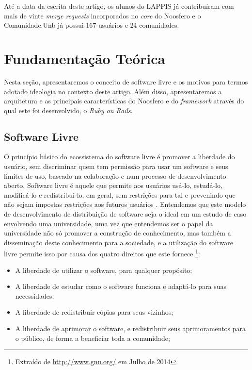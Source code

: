 \documentclass[12pt]{article}
\begin{document}
Até a data da escrita deste artigo, os alunos do LAPPIS já contribuíram com
mais de vinte \textit{merge requests} incorporados no \textit{core} do
Noosfero e o Comunidade.Unb já possui 167 usuários e 24 comunidades.

\section{Fundamentação Teórica} \label{sec:fundamentacao}

Nesta seção, apresentaremos o conceito de software livre e os motivos para
termos adotado ideologia no contexto deste artigo. Além disso, apresentaremos
a arquitetura e as principais características do Noosfero e do
\textit{framework} através do qual este foi desenvolvido, o
\textit{Ruby on Rails}.

\subsection{Software Livre}

O princípio básico do ecossistema do software livre é promover a liberdade
do usuário, sem discriminar quem tem permissão para usar um software e seus
limites de uso, baseado na colaboração e num processo de desenvolvimento
aberto. Software livre é aquele que permite aos usuários usá-lo, estudá-lo,
modificá-lo e redistribui-lo, em geral, sem restrições para tal e prevenindo
que não sejam impostas restrições aos futuros usuários \cite{meirelles2013}.
Entendemos que este modelo de desenvolvimento de distribuição de software
seja o ideal em um estudo de caso envolvendo uma universidade, uma vez que
entendemos ser o papel da universidade não só promover a construção de
conhecimento, mas também a disseminação deste conhecimento para a sociedade,
e a utilização do software livre permite isso por causa dos quatro direitos
que este fornece%
\footnote{Extraído de \url{http://www.gnu.org/} em Julho de 2014}:

\begin{itemize}
  \item A liberdade de utilizar o software, para qualquer propósito;
  \item A liberdade de estudar como o software funciona e adaptá-lo para suas necessidades;
  \item A liberdade de redistribuir cópias para seus vizinhos;
  \item A liberdade de aprimorar o software, e redistribuir seus aprimoramentos para o público,
  de forma a beneficiar toda a comunidade;
\end{itemize}
\end{document}
